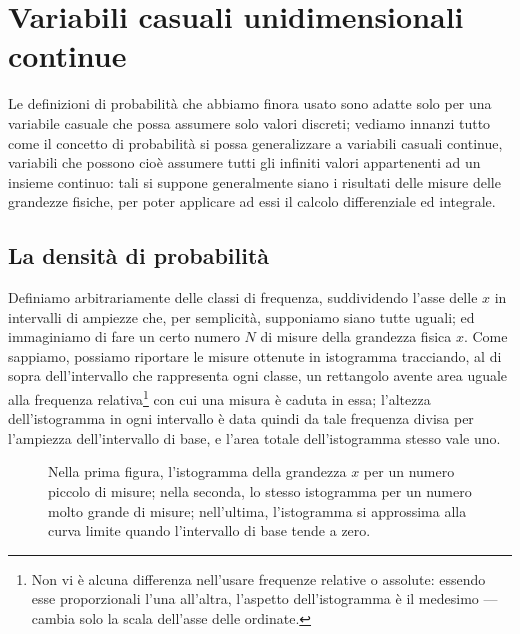 
\chapter{Variabili casuali unidimensionali continue}
Le definizioni di probabilit\`a che abbiamo finora usato
sono adatte solo per una variabile casuale che possa
assumere solo valori discreti; vediamo innanzi tutto come il
concetto di probabilit\`a si possa generalizzare a variabili
casuali continue, variabili che possono cio\`e assumere
tutti gli infiniti valori appartenenti ad un insieme
continuo: tali si suppone generalmente siano i risultati
delle misure delle grandezze fisiche, per poter applicare ad
essi il calcolo differenziale ed integrale.

\section{La densit\`a di probabilit\`a}%
Definiamo arbitrariamente delle classi di frequenza,
suddividendo l'asse delle $x$ in intervalli di ampiezze che,
per semplicit\`a, supponiamo siano tutte uguali; ed
immaginiamo di fare un certo numero $N$ di misure della
grandezza fisica $x$.  Come sappiamo, possiamo riportare le
misure ottenute
in istogramma%
tracciando, al di sopra dell'intervallo che rappresenta ogni
classe, un rettangolo avente area uguale alla frequenza
relativa\/\footnote{Non vi \`e alcuna differenza nell'usare
  frequenze relative o assolute: essendo esse proporzionali
  l'una all'altra, l'aspetto dell'istogramma \`e il medesimo
  --- cambia solo la scala dell'asse delle ordinate.} con
cui una misura \`e caduta in essa; l'altezza dell'istogramma
in ogni intervallo \`e data quindi da tale frequenza divisa
per l'ampiezza dell'intervallo di base, e l'area totale
dell'istogramma stesso vale uno.
\begin{figure}[htbp]
  \vspace*{2ex}
  \begin{center} {
    
  } \end{center}
  \caption[Il comportamento limite delle frequenze
    relative]{Nella prima figura, l'istogramma della
    grandezza $x$ per un numero piccolo di misure; nella
    seconda, lo stesso istogramma per un numero molto
    grande di misure; nell'ultima, l'istogramma si
    approssima alla curva limite quando l'intervallo di
    base tende a zero.}
\end{figure}

